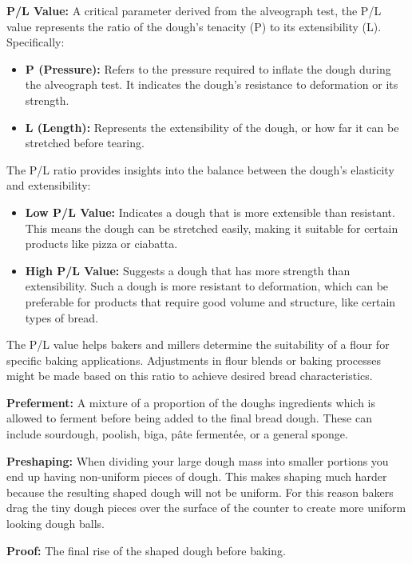 \textbf{P/L Value:} A critical parameter derived from the alveograph test, the P/L
value represents the ratio of the dough's tenacity (P) to its extensibility (L).
Specifically:
\begin{itemize}
    \item \textbf{P (Pressure):} Refers to the pressure required to inflate the dough
    during the alveograph test. It indicates the dough's resistance to deformation or
    its strength.
    \item \textbf{L (Length):} Represents the extensibility of the dough, or how far it
    can be stretched before tearing.
\end{itemize}
The P/L ratio provides insights into the balance between the dough's elasticity and
extensibility:
\begin{itemize}
    \item \textbf{Low P/L Value:} Indicates a dough that is more extensible than
    resistant. This means the dough can be stretched easily, making it suitable for
    certain products like pizza or ciabatta.
    \item \textbf{High P/L Value:} Suggests a dough that has more strength than
    extensibility. Such a dough is more resistant to deformation, which can be
    preferable for products that require good volume and structure, like certain types
    of bread.
\end{itemize}
The P/L value helps bakers and millers determine the suitability of a flour for
specific baking applications. Adjustments in flour blends or baking processes might
be made based on this ratio to achieve desired bread characteristics.

\textbf{Preferment:} A mixture of a proportion of the doughs ingredients which is
allowed to ferment before being added to the final bread dough. These can include
sourdough, poolish, biga, pâte fermentée, or a general sponge.

\textbf{Preshaping:} When dividing your large dough mass into smaller portions you end
up having non-uniform pieces of dough. This makes shaping much harder because the
resulting shaped dough will not be uniform. For this reason bakers drag the tiny dough
pieces over the surface of the counter to create more uniform looking dough balls.

\textbf{Proof:} The final rise of the shaped dough before baking.

